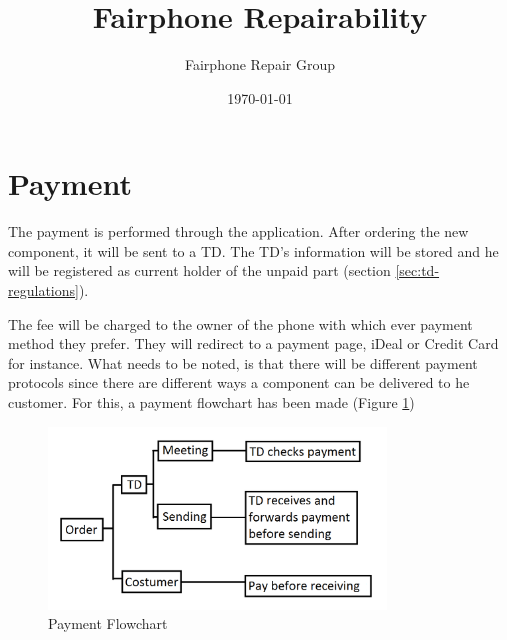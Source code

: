 \documentclass[final,a4paper]{report} %
\author{Fairphone Repair Group}
\title{Fairphone Repairability}
\date{\today}
\begin{document}
	\section{Payment}\label{sec:storyboard-payment}
	The payment is performed through the application. After ordering the new component, it will be sent to a TD. The TD's information will be stored and he will be registered as current holder of the unpaid part (section \ref{sec:td-regulations}). 
	
	The fee will be charged to the owner of the phone with which ever payment method they prefer. They will redirect to a payment page, iDeal or Credit Card for instance. What needs to be noted, is that there will be different payment protocols since there are different ways a component can be delivered to he customer. For this, a payment flowchart has been made (Figure \ref{fig:PaymentFlowChart}) 
	
	\begin{figure}[H]
		\centering
		\includegraphics[width=0.8\textwidth]{resources/PaymentFlowChart}
		\caption{Payment Flowchart}
		\label{fig:PaymentFlowChart}
	\end{figure}
\end{document}

